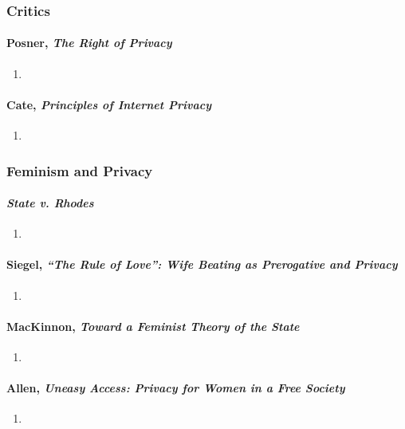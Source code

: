 \subsubsection{Critics}

\paragraph{Posner, \emph{The Right of Privacy}}

\begin{enumerate}
    \item %
\end{enumerate}

\paragraph{Cate, \emph{Principles of Internet Privacy}}

\begin{enumerate}
    \item %
\end{enumerate}

\subsubsection{Feminism and Privacy}

\paragraph{\emph{State v. Rhodes}}

\begin{enumerate}
    \item %
\end{enumerate}

\paragraph{Siegel, \emph{``The Rule of Love'': Wife Beating as Prerogative and 
Privacy}}

\begin{enumerate}
    \item %
\end{enumerate}

\paragraph{MacKinnon, \emph{Toward a Feminist Theory of the State}}

\begin{enumerate}
    \item %
\end{enumerate}

\paragraph{Allen, \emph{Uneasy Access: Privacy for Women in a Free Society}}

\begin{enumerate}
    \item %
\end{enumerate}
